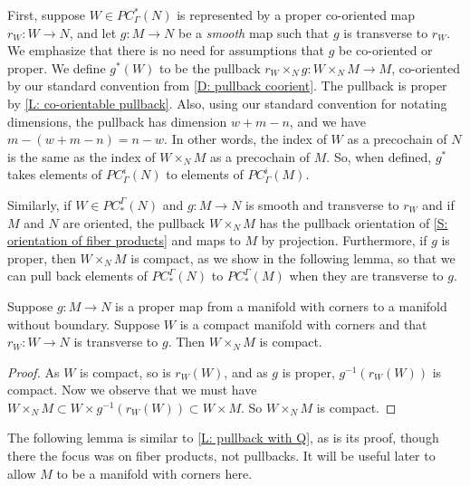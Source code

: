 First, suppose $W \in PC^*_\Gamma(N)$ is represented by a proper co-oriented map $r_W \colon W \to N$, and let $g \colon M \to N$ be a \textit{smooth} map such that $g$ is transverse to $r_W$.
We emphasize that there is no need for assumptions that $g$ be co-oriented or proper.
We define $g^*(W)$ to be the pullback $r_W \times_N g \colon W \times_N M \to M$, co-oriented by our standard convention from \cref{D: pullback coorient}.
The pullback is proper by \cref{L: co-orientable pullback}.
Also, using our standard convention for notating dimensions, the pullback has dimension $w+m-n$, and we have $m - (w+m-n) = n - w$. In other words, the index of $W$ as a precochain of $N$ is the same as the index of $W \times_N M$ as a precochain of $M$.
So, when defined, $g^*$ takes elements of $PC_\Gamma^i(N)$ to elements of $PC_\Gamma^i(M)$.

Similarly, if $W \in PC_*^\Gamma(N)$ and $g \colon M \to N$ is smooth and transverse to $r_W$ and if $M$ and $N$ are oriented, the pullback $W \times_N M$ has the pullback orientation of \cref{S: orientation of fiber products} and maps to $M$ by projection.
Furthermore, if $g$ is proper, then $W \times_N M$ is compact, as we show in the following lemma, so that we can pull back elements of $PC_*^\Gamma(N)$ to $PC_*^\Gamma(M)$ when they are transverse to $g$.

\begin{lemma}\label{L: compact pullback}
	Suppose $g \colon M \to N$ is a proper map from a manifold with corners to a manifold without boundary.
	Suppose $W$ is a compact manifold with corners and that $r_W \colon W \to N$ is transverse to $g$.
	Then $W \times_N M$ is compact.
\end{lemma}

\begin{proof}
	As $W$ is compact, so is $r_W(W)$, and as $g$ is proper, $g^{-1}(r_W(W))$ is compact.
	Now we observe that we must have $W \times_N M \subset W \times g^{-1}(r_W(W)) \subset W \times M$.
	So $W \times_N M$ is compact.
\end{proof}

The following lemma is similar to \cref{L: pullback with Q}, as is its proof, though there the focus was on fiber products, not pullbacks.
It will be useful later to allow $M$ to be a manifold with corners here.

